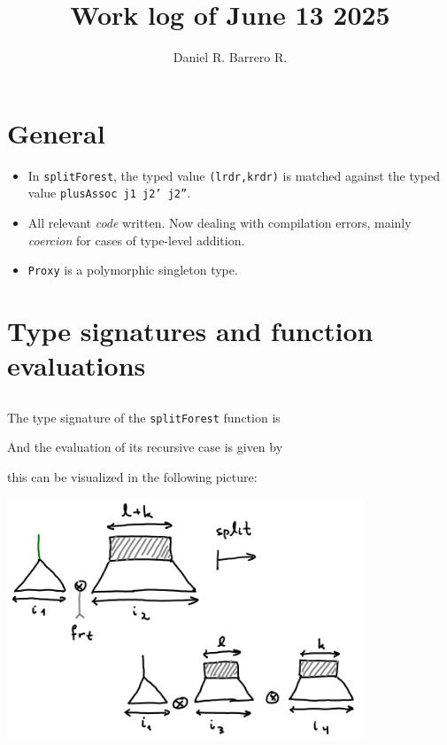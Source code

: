 \documentclass{amsart}
\title{Work log of June 13 2025}
\author{Daniel R. Barrero R.}
\begin{document}
\maketitle

\section{General}

\begin{itemize}
	\item In \texttt{splitForest}, the typed value \texttt{(lrdr,krdr)} is
		matched against the typed value \texttt{plusAssoc j1 j2' j2''}.
	\item All relevant \emph{code} written. Now dealing with compilation
		errors, mainly \emph{coercion} for cases of type-level 
		addition.
	\item \texttt{Proxy} is a polymorphic singleton type.
\end{itemize}

\newpage

\section{Type signatures and function evaluations}

\bigskip
\bigskip

\subsection{}

The type signature of the \texttt{splitForest} function is



\bigskip
\bigskip

And the evaluation of its recursive case is given by



\bigskip
\bigskip

this can be visualized in the following picture:

\bigskip
\bigskip

\includegraphics[width=0.8\textwidth]{forestSplit.png}
\end{document}
